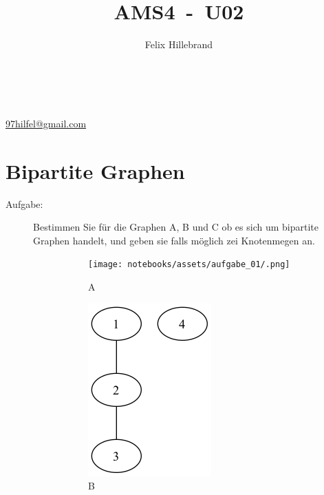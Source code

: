 \documentclass[a4paper,11pt]{report}
\author{Felix Hillebrand}
\makeatletter
\newcommand{\coverpage}{
    \thispagestyle{cover}
    \begin{center}
    {\LARGE \thetitle}\\[0.5cm]
    {\large \theauthor}\\
    \href{mailto:97hilfel@gmail.com}{97hilfel@gmail.com}\\
    \end{center}
    \tableofcontents
    \clearpage
}
\makeatother
\begin{document}

    \title{AMS4~-~U02}
    \coverpage

    \clearpage
    \pagestyle{main}

    \chapter{Bipartite Graphen}
    \begin{description}
        \item[Aufgabe:] Bestimmen Sie für die Graphen A, B und C ob es sich um bipartite Graphen handelt, und geben sie falls möglich zei Knotenmegen an. \hfill
        \begin{figure}[htbp]
            \centering
            \begin{subfigure}[b]{0.3\textwidth}
                \texttt{[image: notebooks/assets/aufgabe\_01/.png]}
                \caption{A}
                \label{fig:a01_a}
            \end{subfigure}
            \hfill
            \begin{subfigure}[b]{0.3\textwidth}
                \includegraphics[height=0.2\textheight]{notebooks/assets/aufgabe_01/B.png}
                \caption{B}
                \label{fig:a01_b}
            \end{subfigure}
            \hfill
            \begin{subfigure}[b]{0.3\textwidth}

\end{subfigure}
\end{figure}
\end{description}
\end{document}
